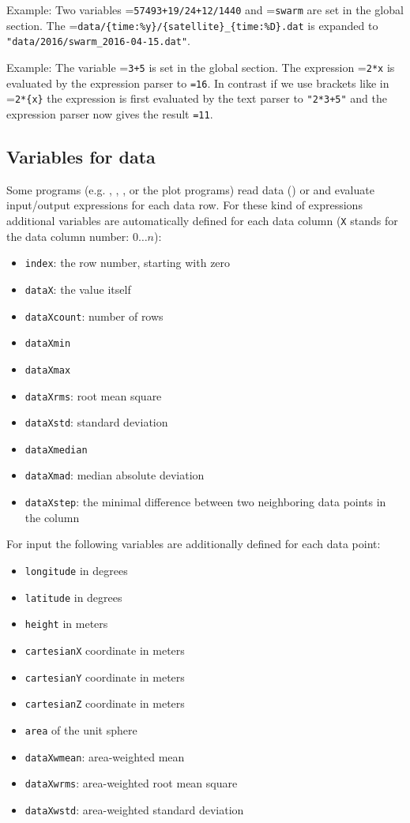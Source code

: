 Example:
Two variables =\verb|57493+19/24+12/1440| and =\verb|swarm| are
set in the global section. The =\verb|data/{time:%y}/{satellite}_{time:%D}.dat|
is expanded to \verb|"data/2016/swarm_2016-04-15.dat"|.

Example:
The variable =\verb|3+5| is set in the global section.
The expression =\verb|2*x| is evaluated by the expression parser to \verb|=16|.
In contrast if we use brackets like in =\verb|2*{x}| the expression is first evaluated
by the text parser to \verb|"2*3+5"| and the expression parser now gives the result \verb|=11|.


\subsection{Variables for data}\label{general.parser:dataVariables}
Some programs (e.g. , ,
, or the plot programs)
read data () or 
and evaluate input/output expressions for each data row.
For these kind of expressions additional variables are automatically defined for each data column
(\verb|X| stands for the data column number: $0\ldots n$):
\begin{itemize}
\item \verb|index|: the row number, starting with zero
\item \verb|dataX|: the value itself
\item \verb|dataXcount|: number of rows
\item \verb|dataXmin|
\item \verb|dataXmax|
\item \verb|dataXrms|: root mean square
\item \verb|dataXstd|: standard deviation
\item \verb|dataXmedian|
\item \verb|dataXmad|: median absolute deviation
\item \verb|dataXstep|: the minimal difference between two neighboring data points in the column
\end{itemize}
For  input the following variables are additionally defined for each data point:
\begin{itemize}
\item \verb|longitude| in degrees
\item \verb|latitude| in degrees
\item \verb|height| in meters
\item \verb|cartesianX| coordinate in meters
\item \verb|cartesianY| coordinate in meters
\item \verb|cartesianZ| coordinate in meters
\item \verb|area| of the unit sphere
\item \verb|dataXwmean|: area-weighted mean
\item \verb|dataXwrms|: area-weighted root mean square
\item \verb|dataXwstd|: area-weighted standard deviation
\end{itemize}


